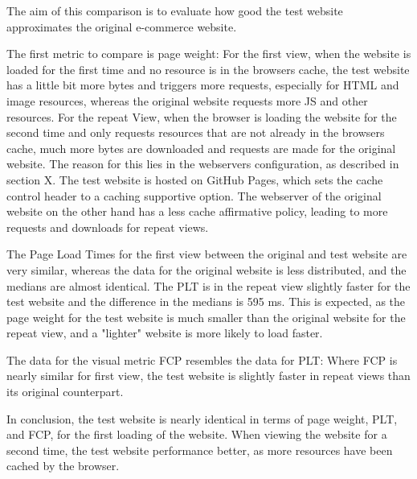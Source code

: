 The aim of this comparison is to evaluate how good the test website approximates the original e-commerce website.


The first metric to compare is page weight:
For the first view, when the website is loaded for the first time and no resource is in the browsers cache, the test website has a little bit more bytes and triggers more requests, especially for HTML and image resources, whereas the original website requests more JS and other resources.
For the repeat View, when the browser is loading the website for the second time and only requests resources that are not already in the browsers cache, much more bytes are downloaded and requests are made for the original website.
The reason for this lies in the webservers configuration, as described in section X.
The test website is hosted on GitHub Pages, which sets the cache control header to a caching supportive option.
The webserver of the original website on the other hand has a less cache affirmative policy, leading to more requests and downloads for repeat views.



The Page Load Times for the first view between the original and test website are very similar, whereas the data for the original website is less distributed, and the medians are almost identical.
The PLT is in the repeat view slightly faster for the test website and the difference in the medians is 595 ms.
This is expected, as the page weight for the test website is much smaller than the original website for the repeat view, and a "lighter" website is more likely to load faster.




The data for the visual metric FCP resembles the data for PLT:
Where FCP is nearly similar for first view, the test website is slightly faster in repeat views than its original counterpart.




In conclusion, the test website is nearly identical in terms of page weight, PLT, and FCP, for the first loading of the website.
When viewing the website for a second time, the test website performance better, as more resources have been cached by the browser.

